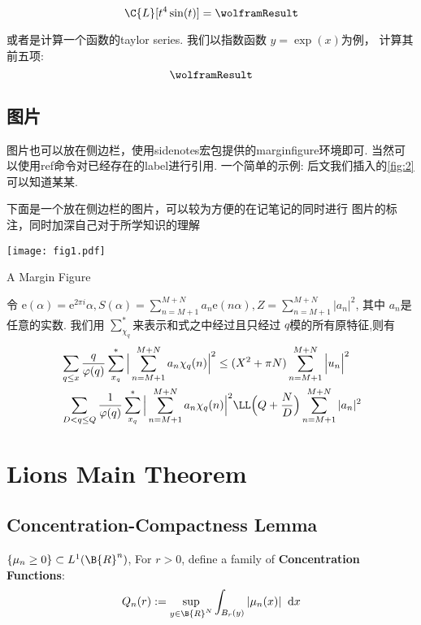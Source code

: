 \documentclass[
	lang=cn,
  hyper,
  class=book,
  classOption={twoside},
  layout={margin},
	mathSpec={alias}
]{zlatex}
\def\ee{\mathrm{e}}
\def\dd{\;\mathrm{d}}
\begin{document}
\[
  \C{L}[t^4\sin(t)] = \wolframResult
\]

或者是计算一个函数的taylor series. 我们以指数函数 $y=\exp(x)$为例，
计算其前五项:
\[
  \wolframResult
\]

\subsection{图片}
图片也可以放在侧边栏，使用sidenotes宏包提供的marginfigure环境即可.
当然可以使用ref命令对已经存在的label进行引用. 一个简单的示例:
后文我们插入的\cref{fig:2}可以知道某某.


\begin{marginfigure}	
	\centering\small\kaishu
	下面是一个放在侧边栏的图片，可以较为方便的在记笔记的同时进行
	图片的标注，同时加深自己对于所学知识的理解
	\bigskip

	\texttt{[image: fig1.pdf]}
	\caption{A Margin Figure}
	\label{fig:1}
\end{marginfigure}

\begin{lemma}
令 $\ee(\alpha) = \ee^{2\pi i}\alpha, S(\alpha) = \sum_{n=M+1}^{M+N}{a_n\ee(n\alpha)}, Z = \sum_{n=M+1}^{M+N}{|a_n|^2}$,
其中 $a_n$是任意的实数. 我们用 $\sum_{\chi_q}^{*}$来表示和式之中经过且只经过 $q$模的所有原特征,则有
\begin{align}
    & \sum_{q\leq x}\frac{q}{\varphi(q)}\sum_{x_{q}}^{*}\Big|\sum_{n=M+1}^{M+N}a_{n}\chi_{q}(n)\Big|^{2}\le (X^{2}+\pi N)\sum_{n=M+1}^{M+N}\Big|u_{n}\Big|^{2} \\
    & \sum_{D<q\leq Q}\frac{1}{\varphi(q)}\sum_{x_{q}}^{*}\Big|\sum_{n=M+1}^{M+N}a_{n}\chi_{q}(n)\Big|^{2}\LL\Big(Q+\frac{N}{D}\Big)\sum_{n=M+1}^{M+N}|a_{n}|^{2}
\end{align}
\end{lemma}


\section{Lions Main Theorem}
\subsection{Concentration-Compactness Lemma}
$\{\mu_n\ge 0\}\subset L^1(\B{R}^n)$, For $r>0$, define a family of \textbf{Concentration Functions}:
\begin{align}
    Q_n(r) := \sup_{y\in\B{R}^N}\int_{B_r(y)}|\mu_n(x)|\;\dd x
\end{align}
\end{document}
